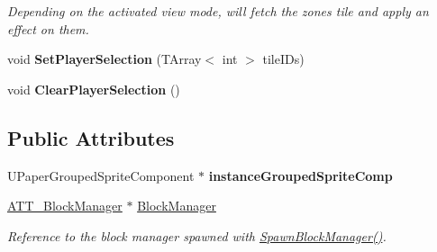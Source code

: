 \begin{DoxyCompactItemize}
\begin{DoxyCompactList}\small\item\em Depending on the activated view mode, will fetch the zone\textquotesingle{}s tile and apply an effect on them. \end{DoxyCompactList}\item 
\mbox{\label{class_a_t_t___grid_manager_a8003c640783e0bf93b4bfe32f44a805d}} 
void {\bfseries Set\+Player\+Selection} (T\+Array$<$ int $>$ tile\+I\+Ds)
\item 
\mbox{\label{class_a_t_t___grid_manager_a81c6abf3e305d351a7cc0157a485c23e}} 
void {\bfseries Clear\+Player\+Selection} ()
\end{DoxyCompactItemize}
\subsection*{Public Attributes}
\begin{DoxyCompactItemize}
\item 
\mbox{\label{class_a_t_t___grid_manager_a828e77c965c9f6c67046d9df6a128300}} 
U\+Paper\+Grouped\+Sprite\+Component $\ast$ {\bfseries instance\+Grouped\+Sprite\+Comp}
\item 
\mbox{\hyperlink{class_a_t_t___block_manager}{A\+T\+T\+\_\+\+Block\+Manager}} $\ast$ \mbox{\hyperlink{class_a_t_t___grid_manager_ad4f5e3050493fe0ed39bee5bb9f93182}{Block\+Manager}}
\begin{DoxyCompactList}\small\item\em Reference to the block manager spawned with \mbox{\hyperlink{class_a_t_t___grid_manager_aa5645338890f95f2d400420c29f82952}{Spawn\+Block\+Manager()}}. \end{DoxyCompactList}\end{DoxyCompactItemize}
